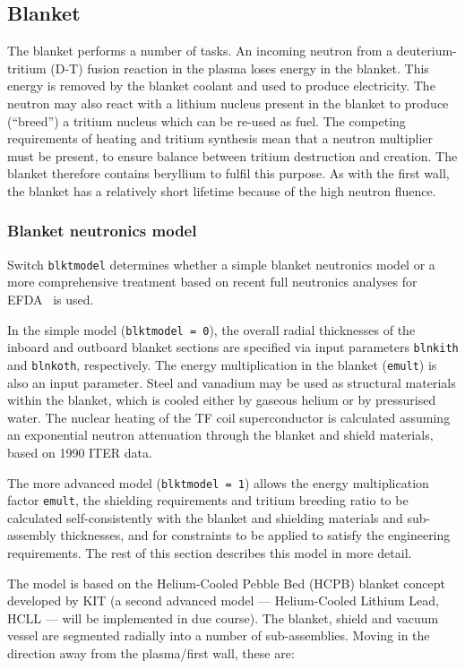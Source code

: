 \documentclass[11pt,a4paper]{report}
\begin{document}
\subsection{Blanket}

The blanket performs a number of tasks. An incoming neutron from a
deuterium-tritium (D-T) fusion reaction in the plasma loses energy in the
blanket. This energy is removed by the blanket coolant and used to produce
electricity. The neutron may also react with a lithium nucleus present in the
blanket to produce (``breed'') a tritium nucleus which can be re-used as
fuel. The competing requirements of heating and tritium synthesis mean that a
neutron multiplier must be present, to ensure balance between tritium
destruction and creation. The blanket therefore contains beryllium to fulfil
this purpose. As with the first wall, the blanket has a relatively short
lifetime because of the high neutron fluence.

\subsubsection{Blanket neutronics model}
\label{sec:blanket_neutronics}

Switch \texttt{blktmodel} determines whether a simple blanket neutronics model
or a more comprehensive treatment based on recent full neutronics analyses for
EFDA~\cite{efda_blanket_model} is used.

In the simple model (\texttt{blktmodel = 0}), the overall radial thicknesses
of the inboard and outboard blanket sections are specified via input
parameters \texttt{blnkith} and \texttt{blnkoth}, respectively. The energy
multiplication in the blanket (\texttt{emult}) is also an input
parameter. Steel and vanadium may be used as structural materials within the
blanket, which is cooled either by gaseous helium or by pressurised water. The
nuclear heating of the TF coil superconductor is calculated assuming an
exponential neutron attenuation through the blanket and shield materials,
based on 1990 ITER data.

The more advanced model (\texttt{blktmodel = 1}) allows the energy
multiplication factor \texttt{emult}, the shielding requirements and tritium
breeding ratio to be calculated self-consistently with the blanket and
shielding materials and sub-assembly thicknesses, and for constraints to be
applied to satisfy the engineering requirements. The rest of this section
describes this model in more detail.

The model is based on the Helium-Cooled Pebble Bed (HCPB) blanket concept
developed by KIT (a second advanced model --- Helium-Cooled Lithium Lead, HCLL
--- will be implemented in due course). The blanket, shield and vacuum vessel
are segmented radially into a number of sub-assemblies. Moving in the
direction away from the plasma/first wall, these are:
\end{document}
